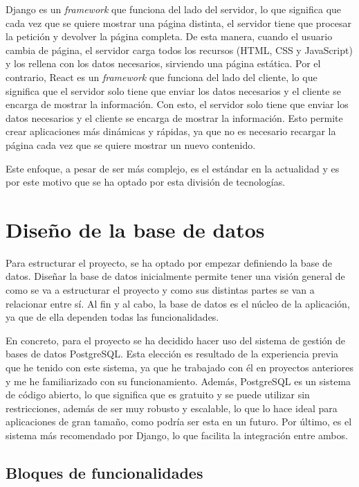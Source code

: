 Django es un \textit{framework} que funciona del lado del servidor, lo que significa que cada vez que se quiere mostrar una página distinta, el servidor tiene que procesar la petición y devolver la página completa. De esta manera, cuando el usuario cambia de página, el servidor carga todos los recursos (HTML, CSS y JavaScript) y los rellena con los datos necesarios, sirviendo una página estática. Por el contrario, React es un \textit{framework} que funciona del lado del cliente, lo que significa que el servidor solo tiene que enviar los datos necesarios y el cliente se encarga de mostrar la información. Con esto, el servidor solo tiene que enviar los datos necesarios y el cliente se encarga de mostrar la información. Esto permite crear aplicaciones más dinámicas y rápidas, ya que no es necesario recargar la página cada vez que se quiere mostrar un nuevo contenido.

Este enfoque, a pesar de ser más complejo, es el estándar en la actualidad y es por este motivo que se ha optado por esta división de tecnologías.

\section{Diseño de la base de datos}
\label{sec:diseno_base_datos}

Para estructurar el proyecto, se ha optado por empezar definiendo la base de datos. Diseñar la base de datos inicialmente permite tener una visión general de como se va a estructurar el proyecto y como sus distintas partes se van a relacionar entre sí. Al fin y al cabo, la base de datos es el núcleo de la aplicación, ya que de ella dependen todas las funcionalidades.

En concreto, para el proyecto se ha decidido hacer uso del sistema de gestión de bases de datos PostgreSQL. Esta elección es resultado de la experiencia previa que he tenido con este sistema, ya que he trabajado con él en proyectos anteriores y me he familiarizado con su funcionamiento. Además, PostgreSQL es un sistema de código abierto, lo que significa que es gratuito y se puede utilizar sin restricciones, además de ser muy robusto y escalable, lo que lo hace ideal para aplicaciones de gran tamaño, como podría ser esta en un futuro. Por último, es el sistema más recomendado por Django, lo que facilita la integración entre ambos.

\subsection{Bloques de funcionalidades}

